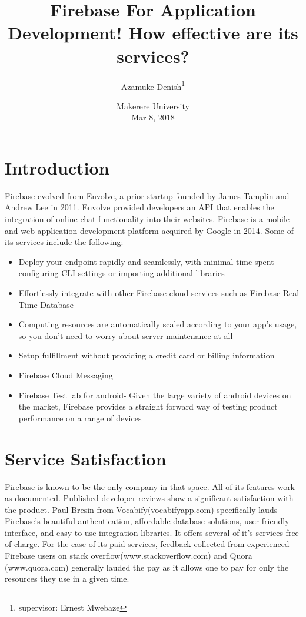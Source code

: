 \documentclass[options]{article}
\title{Firebase For Application Development! How effective are its services?}
\author{Azamuke Denish\thanks{supervisor: Ernest Mwebaze}}\newpage
\date{%
    Makerere University\\%
    Mar 8, 2018
}
\begin{document}
\begin{titlepage}
\maketitle
\end{titlepage}
\newpage

\section{Introduction}
Firebase evolved from Envolve, a prior startup founded by James Tamplin and Andrew Lee in 2011\cite{kanwal2017app}. Envolve provided developers an API that enables the integration of online chat functionality into their websites. \cite{kumar2016implementing}Firebase is a mobile and web application development platform acquired by Google in 2014\cite{anupamasmart}. Some of its services include the following:
\begin{itemize}
    \item Deploy your endpoint rapidly and seamlessly, with minimal time spent configuring CLI settings or importing additional libraries
    \item Effortlessly integrate with other Firebase cloud services such as Firebase Real Time Database
    \item Computing resources are automatically scaled according to your app's usage, so you don't need to worry about server maintenance at all
    \item Setup fulfillment without providing a credit card or billing information
    \item Firebase Cloud Messaging\cite{moroney2017firebase}
    \item \cite{rojas2016cloud}Firebase Test lab for android- Given the large variety of android devices on the market, Firebase provides a straight forward way of testing product performance on a range of devices

\end{itemize}
\section{Service Satisfaction}
Firebase is known to be the only company in that space\cite{greiff2000name}. All of its features work as  documented.
Published developer reviews show a significant  satisfaction with the product. Paul Bresin from Vocabify(vocabifyapp.com) specifically lauds \cite{hess2016algorithm}Firebase’s beautiful authentication, affordable database solutions, user friendly interface, and easy to use integration libraries.
It offers several of it’s services free of charge. For the case of its paid services, feedback collected from experienced Firebase users\cite{villanes2017software} on stack overflow(www.stackoverflow.com) and Quora (www.quora.com) generally lauded the pay as it allows one to pay for only the resources they use in a given time.\cite{rahmifindoctor}
\end{document}
